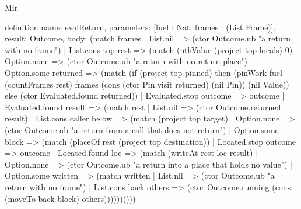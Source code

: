 \begin{lexlean}{Mir}
\begin{semanticmodule}
definition{
  name: evalReturn,
  parameters: [fuel : Nat, frames : (List Frame)],
  result: Outcome,
  body: (match frames
    | List.nil => (ctor Outcome.ub "a return with no frame")
    | List.cons top rest => (match (nthValue (project top locals) 0)
      | Option.none => (ctor Outcome.ub "a return with no return place")
      | Option.some returned => (match (if (project top pinned) then (pinWork fuel (countFrames rest) frames (cons (ctor Pin.visit returned) (nil Pin)) (nil Value)) else (ctor Evaluated.found returned))
      | Evaluated.stop outcome => outcome
      | Evaluated.found result => (match rest
        | List.nil => (ctor Outcome.returned result)
        | List.cons caller below => (match (project top target)
          | Option.none => (ctor Outcome.ub "a return from a call that does not return")
          | Option.some block => (match (placeOf rest (project top destination))
            | Located.stop outcome => outcome
            | Located.found loc => (match (writeAt rest loc result)
              | Option.none => (ctor Outcome.ub "a return into a place that holds no value")
              | Option.some written => (match written
                | List.nil => (ctor Outcome.ub "a return with no frame")
                | List.cons back others => (ctor Outcome.running (cons (moveTo back block) others))))))))))
}


\end{semanticmodule}
\end{lexlean}
